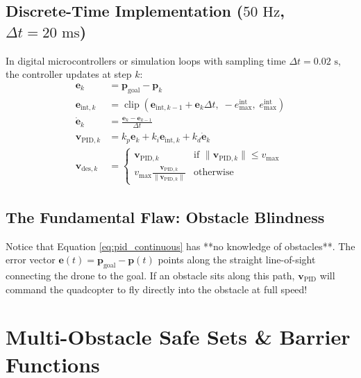 \documentclass[11pt,a4paper]{article}
\begin{document}
\subsection{Discrete-Time Implementation (\texorpdfstring{$50\text{ Hz}$}{50 Hz}, \texorpdfstring{$\Delta t = 20\text{ ms}$}{dt = 20 ms})}
In digital microcontrollers or simulation loops with sampling time $\Delta t = 0.02\text{ s}$, the controller updates at step $k$:
\begin{align}
\mathbf{e}_k &= \mathbf{p}_{\mathrm{goal}} - \mathbf{p}_k \\
\mathbf{e}_{\mathrm{int}, k} &= \operatorname{clip}\left(\mathbf{e}_{\mathrm{int}, k-1} + \mathbf{e}_k \Delta t, \; -e_{\max}^{\mathrm{int}}, \; e_{\max}^{\mathrm{int}}\right) \\
\dot{\mathbf{e}}_k &= \frac{\mathbf{e}_k - \mathbf{e}_{k-1}}{\Delta t} \\
\mathbf{v}_{\mathrm{PID}, k} &= k_p \mathbf{e}_k + k_i \mathbf{e}_{\mathrm{int}, k} + k_d \dot{\mathbf{e}}_k \\
\mathbf{v}_{\mathrm{des}, k} &= \begin{cases} \mathbf{v}_{\mathrm{PID}, k} & \text{if } \|\mathbf{v}_{\mathrm{PID}, k}\| \le v_{\max} \\ v_{\max} \frac{\mathbf{v}_{\mathrm{PID}, k}}{\|\mathbf{v}_{\mathrm{PID}, k}\|} & \text{otherwise} \end{cases}
\end{align}

\subsection{The Fundamental Flaw: Obstacle Blindness}
Notice that Equation \eqref{eq:pid_continuous} has **no knowledge of obstacles**. The error vector $\mathbf{e}(t) = \mathbf{p}_{\mathrm{goal}} - \mathbf{p}(t)$ points along the straight line-of-sight connecting the drone to the goal. If an obstacle sits along this path, $\mathbf{v}_{\mathrm{PID}}$ will command the quadcopter to fly directly into the obstacle at full speed!

\section{Multi-Obstacle Safe Sets \& Barrier Functions}
\end{document}
